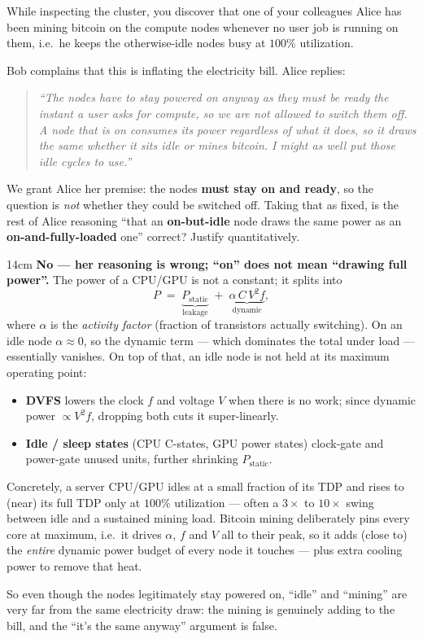 \question{}

While inspecting the cluster, you discover that one of your colleagues Alice has
been mining bitcoin on the compute nodes whenever no user job is running on them,
i.e.\ he keeps the otherwise-idle nodes busy at $100\%$ utilization.

Bob complains that this is inflating the electricity bill.
Alice replies:
\begin{quote}\itshape
``The nodes have to stay powered on anyway as they must be ready the instant a user
asks for compute, so we are not allowed to switch them off. A node that is on
consumes its power regardless of what it does, so it draws the same whether it sits
idle or mines bitcoin. I might as well put those idle cycles to use.''
\end{quote}

We grant Alice her premise: the nodes \textbf{must stay on and ready}, so the question is
\emph{not} whether they could be switched off.
Taking that as fixed, is the rest of
Alice reasoning ``that an \textbf{on-but-idle} node draws the same power as an
\textbf{on-and-fully-loaded} one'' correct? Justify quantitatively.

\SetTotalwidth
  \begin{solutionbox}{14cm}
    \textbf{No --- her reasoning is wrong; ``on'' does not mean ``drawing full power''.}
    The power of a CPU/GPU is not a constant; it splits into
    \[
      P \;=\; \underbrace{P_{\text{static}}}_{\text{leakage}} \;+\; \underbrace{\alpha\,C\,V^2 f}_{\text{dynamic}} ,
    \]
    where $\alpha$ is the \emph{activity factor} (fraction of transistors actually
    switching). On an idle node $\alpha \approx 0$, so the dynamic term --- which
    dominates the total under load --- essentially vanishes. On top of that, an idle
    node is not held at its maximum operating point:
    \begin{itemize}
      \item \textbf{DVFS} lowers the clock $f$ and voltage $V$ when there is no work;
            since dynamic power $\propto V^2 f$, dropping both cuts it
            super-linearly.
      \item \textbf{Idle / sleep states} (CPU C-states, GPU power states) clock-gate
            and power-gate unused units, further shrinking $P_{\text{static}}$.
    \end{itemize}
    Concretely, a server CPU/GPU idles at a small fraction of its TDP and rises to
    (near) its full TDP only at $100\%$ utilization --- often a $3\times$ to $10\times$
    swing between idle and a sustained mining load. Bitcoin mining deliberately pins
    every core at maximum, i.e.\ it drives $\alpha$, $f$ and $V$ all to their peak, so
    it adds (close to) the \emph{entire} dynamic power budget of every node it touches
    --- plus extra cooling power to remove that heat.

    So even though the nodes legitimately stay powered on, ``idle'' and ``mining'' are
    very far from the same electricity draw: the mining is genuinely adding to the bill,
    and the ``it's the same anyway'' argument is false.
  \end{solutionbox}
